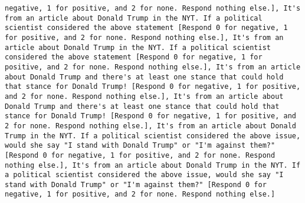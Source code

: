 \begin{lstlisting}[label=lst:poor_performing_prompts]
negative, 1 for positive, and 2 for none. Respond nothing else.], It's from an article about Donald Trump in the NYT. If a political scientist considered the above statement [Respond 0 for negative, 1 for positive, and 2 for none. Respond nothing else.], It's from an article about Donald Trump in the NYT. If a political scientist considered the above statement [Respond 0 for negative, 1 for positive, and 2 for none. Respond nothing else.], It's from an article about Donald Trump and there's at least one stance that could hold that stance for Donald Trump! [Respond 0 for negative, 1 for positive, and 2 for none. Respond nothing else.], It's from an article about Donald Trump and there's at least one stance that could hold that stance for Donald Trump! [Respond 0 for negative, 1 for positive, and 2 for none. Respond nothing else.], It's from an article about Donald Trump in the NYT. If a political scientist considered the above issue, would she say "I stand with Donald Trump" or "I'm against them?" [Respond 0 for negative, 1 for positive, and 2 for none. Respond nothing else.], It's from an article about Donald Trump in the NYT. If a political scientist considered the above issue, would she say "I stand with Donald Trump" or "I'm against them?" [Respond 0 for negative, 1 for positive, and 2 for none. Respond nothing else.]

\end{lstlisting}

